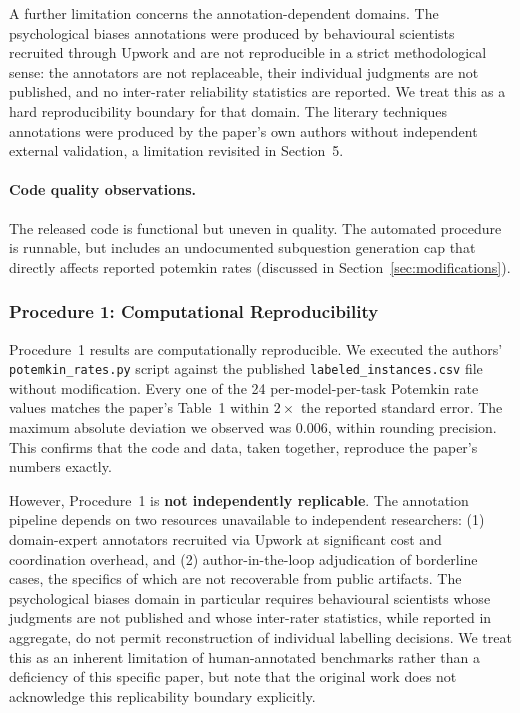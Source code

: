 \documentclass[sigconf,authordraft]{acmart}
\begin{document}
A further limitation concerns the annotation-dependent domains. The psychological biases annotations were produced by behavioural scientists recruited through Upwork and are not reproducible in a strict methodological sense: the annotators are not replaceable, their individual judgments are not published, and no inter-rater reliability statistics are reported. We treat this as a hard reproducibility boundary for that domain. The literary techniques annotations were produced by the paper's own authors without independent external validation, a limitation revisited in Section~5.

\paragraph{Code quality observations.}
The released code is functional but uneven in quality. The automated procedure is runnable, but includes an undocumented subquestion generation cap that directly affects reported potemkin rates (discussed in Section~\ref{sec:modifications}).

\subsubsection{Procedure 1: Computational Reproducibility}
\label{sec:proc1-repro}

Procedure~1 results are computationally reproducible. We executed the authors' \texttt{potemkin\_rates.py} script against the published \texttt{labeled\_instances.csv} file without modification. Every one of the 24 per-model-per-task Potemkin rate values matches the paper's Table~1 within $2\times$ the reported standard error. The maximum absolute deviation we observed was 0.006, within rounding precision. This confirms that the code and data, taken together, reproduce the paper's numbers exactly.

However, Procedure~1 is \textbf{not independently replicable}. The annotation pipeline depends on two resources unavailable to independent researchers: (1) domain-expert annotators recruited via Upwork at significant cost and coordination overhead, and (2) author-in-the-loop adjudication of borderline cases, the specifics of which are not recoverable from public artifacts. The psychological biases domain in particular requires behavioural scientists whose judgments are not published and whose inter-rater statistics, while reported in aggregate, do not permit reconstruction of individual labelling decisions. We treat this as an inherent limitation of human-annotated benchmarks rather than a deficiency of this specific paper, but note that the original work does not acknowledge this replicability boundary explicitly.
\end{document}
